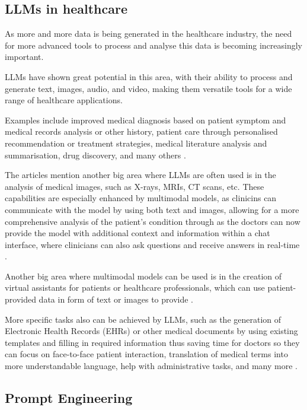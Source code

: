 \subsection{LLMs in healthcare}

As more and more data is being generated in the healthcare industry, the need for more advanced tools to process and analyse this data is becoming increasingly important. 

LLMs have shown great potential in this area, with their ability to process and generate text, images, audio, and video, making them versatile tools for a wide range of healthcare applications. 

Examples include improved medical diagnosis based on patient symptom and medical records analysis or other history, patient care through personalised recommendation or treatment strategies, medical literature analysis and summarisation, drug discovery, and many others \parencite{llm_healthcare,llm_healthcare3,llm_healthcare4}.

The articles mention another big area where LLMs are often used is in the analysis of medical images, such as X-rays, MRIs, CT scans, etc. These capabilities are especially enhanced by multimodal models, as clinicins can communicate with the model by using both text and images, allowing for a more comprehensive analysis of the patient's condition through as the doctors can now provide the model with additional context and information within a chat interface, where clinicians can also ask questions and receive answers in real-time \parencite{llm_healthcare3}. 

Another big area where multimodal models can be used is in the creation of virtual assistants for patients or healthcare professionals, which can use patient-provided data in form of text or images to provide  \parencite{llm_healthcare,llm_healthcare3}.

More specific tasks also can be achieved by LLMs, such as the generation of Electronic Health Records (EHRs) or other medical documents by using existing templates and filling in required information thus saving time for doctors so they can focus on face-to-face patient interaction, translation of medical terms into more understandable language, help with administrative tasks, and many more \parencite{llm_healthcare4}.

\subsection{Prompt Engineering}

